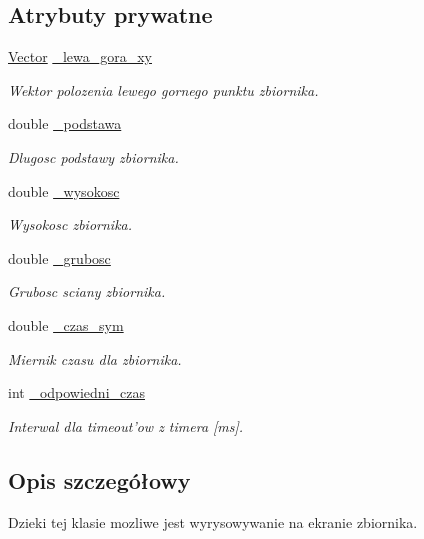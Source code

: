 \subsection*{Atrybuty prywatne}
\begin{DoxyCompactItemize}
\item 
\hyperlink{class_vector}{Vector} \hyperlink{class_zbiornik_aab83049b3afbd20e1f158daf16e17e87}{\-\_\-lewa\-\_\-gora\-\_\-xy}
\begin{DoxyCompactList}\small\item\em Wektor polozenia lewego gornego punktu zbiornika. \end{DoxyCompactList}\item 
double \hyperlink{class_zbiornik_aff57d3fb370566986df4eb58711cbfae}{\-\_\-podstawa}
\begin{DoxyCompactList}\small\item\em Dlugosc podstawy zbiornika. \end{DoxyCompactList}\item 
double \hyperlink{class_zbiornik_abe4d7a4e2d39e802d656b03bb3afdd3f}{\-\_\-wysokosc}
\begin{DoxyCompactList}\small\item\em Wysokosc zbiornika. \end{DoxyCompactList}\item 
double \hyperlink{class_zbiornik_a8a1db6d1edbfaa1a4f84d9717a8c0dfc}{\-\_\-grubosc}
\begin{DoxyCompactList}\small\item\em Grubosc sciany zbiornika. \end{DoxyCompactList}\item 
double \hyperlink{class_zbiornik_a4a30db357e7e7b3ed28acb59db5a86ad}{\-\_\-czas\-\_\-sym}
\begin{DoxyCompactList}\small\item\em Miernik czasu dla zbiornika. \end{DoxyCompactList}\item 
int \hyperlink{class_zbiornik_a14cf0ec861fc38fe40081342ef1e00df}{\-\_\-odpowiedni\-\_\-czas}
\begin{DoxyCompactList}\small\item\em Interwal dla timeout'ow z timera \mbox{[}ms\mbox{]}. \end{DoxyCompactList}\end{DoxyCompactItemize}


\subsection{Opis szczegółowy}
Dzieki tej klasie mozliwe jest wyrysowywanie na ekranie zbiornika. 

